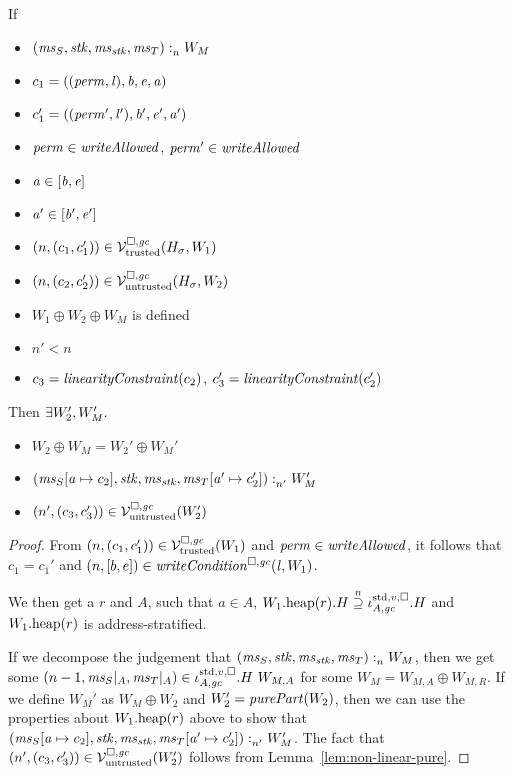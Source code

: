 \begin{lemma}
  \label{lem:store-reg-works}
  If
  \begin{itemize}
  \item $\memSat{(\ms_S,\stk,\ms_\stk,\ms_T)}{W_M}$
  \item $c_1 = ((\perm,\lin),\baddr,\eaddr,\aaddr)$
  \item $c_1' = ((\perm',\lin'),\baddr',\eaddr',\aaddr')$
  \item $\perm \in \writeAllowed{}$, $\perm' \in \writeAllowed{}$
  \item $\aaddr \in [\baddr,\eaddr]$
  \item $\aaddr' \in [\baddr',\eaddr']$
  \item $\npair{(c_1,c_1')}\in\lrvg{\trusted}(H_\sigma,W_1)$
  \item $\npair{(c_2,c_2')}\in\lrv(H_\sigma,W_2)$
  \item $W_1 \oplus W_2 \oplus W_M$ is defined
  \item $n' < n$
  \item $c_3 = \linCons{c_2}$, $c_3' = \linCons{c_2'}$
  \end{itemize}
  Then $\exists W_2', W_M'\ldotp$
  \begin{itemize}
  \item $W_2 \oplus W_M = W_2' \oplus W_M'$
  \item $\memSat[n']{(\ms_S\update{\aaddr}{c_2},\stk,\ms_\stk,\ms_T\update{\aaddr'}{c_2'})}{W_M'}$
  \item $\npair[n']{(c_3,c_3')} \in \lrv(W_2')$
  \end{itemize}
\end{lemma}
\begin{proof}
  From $\npair{(c_1,c_1')}\in\lrvg{\trusted}(W_1)$ and $\perm \in \writeAllowed{}$, it follows that $c_1 = c_1'$ and $\npair{[b,e]} \in \writeCond{\lin,W_1}$. 

  We then get a $r$ and $A$, such that $a \in A$, $\pwheap[W_1](r).H \nsupeq \stdreg{A,\gc}{v}.H$ and $\pwheap[W_1](r)$ is address-stratified.

  If we decompose the judgement that $\memSat{(\ms_S,\stk,\ms_\stk,\ms_T)}{W_M}$, then we get some $\npair[n-1]{\ms_S|_A, \ms_T|_A} \in \stdreg{A,\gc}{v}.H~W_{M,A}$ for some $W_M = W_{M,A} \oplus W_{M,R}$.
  If we define $W_M'$ as $W_M \oplus W_2$ and $W_2' = \purePart{W_2}$, then we can use the properties about $\pwheap[W_1](r)$ above to show that  $\memSat[n']{(\ms_S\update{\aaddr}{c_2},\stk,\ms_\stk,\ms_T\update{\aaddr'}{c_2'})}{W_M'}$.
  The fact that $\npair[n']{(c_3,c_3')} \in \lrv(W_2')$ follows from Lemma~\ref{lem:non-linear-pure}.
\end{proof}

